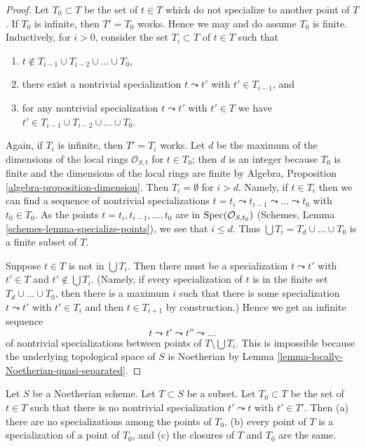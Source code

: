 \begin{proof}
Let $T_0 \subset T$ be the set of $t \in T$ which do not specialize
to another point of $T$. If $T_0$ is infinite, then $T' = T_0$ works.
Hence we may and do assume $T_0$ is finite.
Inductively, for $i > 0$, consider the set $T_i \subset T$
of $t \in T$ such that
\begin{enumerate}
\item $t \not \in T_{i - 1} \cup T_{i - 2} \cup \ldots \cup T_0$,
\item there exist a nontrivial specialization $t \leadsto t'$ with
$t' \in T_{i - 1}$, and
\item for any nontrivial specialization
$t \leadsto t'$ with $t' \in T$ we have
$t' \in T_{i - 1} \cup T_{i - 2} \cup \ldots \cup T_0$.
\end{enumerate}
Again, if $T_i$ is infinite, then $T' = T_i$ works.
Let $d$ be the maximum of the dimensions of the local rings
$\mathcal{O}_{S, t}$ for $t \in T_0$; then $d$ is an integer
because $T_0$ is finite and the dimensions of the local rings
are finite by Algebra, Proposition \ref{algebra-proposition-dimension}.
Then $T_i = \emptyset$ for $i > d$.
Namely, if $t \in T_i$ then we can find a sequence
of nontrivial specializations
$t = t_i \leadsto t_{i - 1} \leadsto \ldots \leadsto t_0$
with $t_0 \in T_0$. As
the points $t = t_i, t_{i - 1}, \ldots, t_0$ are in
$\mathop{\mathrm{Spec}}(\mathcal{O}_{S, t_0})$
(Schemes, Lemma \ref{schemes-lemma-specialize-points}),
we see that $i \leq d$.
Thus $\bigcup T_i = T_d \cup \ldots \cup T_0$ is a finite subset of $T$.

\medskip\noindent
Suppose $t \in T$ is not in $\bigcup T_i$. Then there must be a specialization
$t \leadsto t'$ with $t' \in T$ and $t' \not \in \bigcup T_i$. (Namely, if
every specialization of $t$ is in the finite set $T_d \cup \ldots \cup T_0$,
then there is a maximum $i$ such that there is some specialization
$t \leadsto t'$ with $t' \in T_i$ and then $t \in T_{i + 1}$ by construction.)
Hence we get an infinite sequence
$$
t \leadsto t' \leadsto t'' \leadsto \ldots
$$
of nontrivial specializations between points of $T \setminus \bigcup T_i$.
This is impossible because the underlying topological space of $S$
is Noetherian by Lemma \ref{lemma-locally-Noetherian-quasi-separated}.
\end{proof}

\begin{lemma}
\label{lemma-maximal-points}
Let $S$ be a Noetherian scheme. Let $T \subset S$ be a subset. Let
$T_0 \subset T$ be the set of $t \in T$ such that there is no nontrivial
specialization $t' \leadsto t$ with $t' \in T'$. Then (a) there are
no specializations among the points of $T_0$, (b) every point of
$T$ is a specialization of a point of $T_0$, and (c) the closures
of $T$ and $T_0$ are the same.
\end{lemma}

